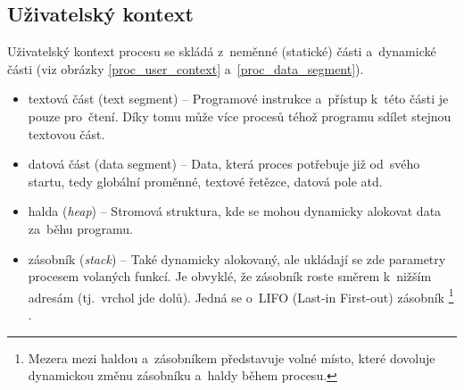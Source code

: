 \subsection{Uživatelský kontext}

Uživatelský kontext procesu se skládá z~neměnné (statické) části a~dynamické části (viz obrázky \ref{proc_user_context} a~\ref{proc_data_segment}).

\begin{itemize}
	\item textová část (text segment) -- Programové instrukce a~přístup k~této části je pouze pro~čtení. Díky tomu může více procesů téhož programu sdílet stejnou textovou část.
	\item datová část (data segment) -- Data, která proces potřebuje již od~svého startu, tedy globální proměnné, textové řetězce, datová pole atd.
	\item halda (\emph{heap}) -- Stromová struktura, kde se mohou dynamicky alokovat data za~běhu programu.
	\item zásobník (\emph{stack}) -- Také dynamicky alokovaný, ale  ukládají se zde parametry procesem volaných funkcí. Je obvyklé, že zásobník roste směrem k~nižším adresám (tj.~vrchol jde dolů). Jedná se o~LIFO (Last-in First-out) zásobník%
	\footnote{Mezera mezi haldou a~zásobníkem představuje volné místo, které dovoluje dynamickou změnu zásobníku a~haldy během procesu.}%
	.
\end{itemize}

